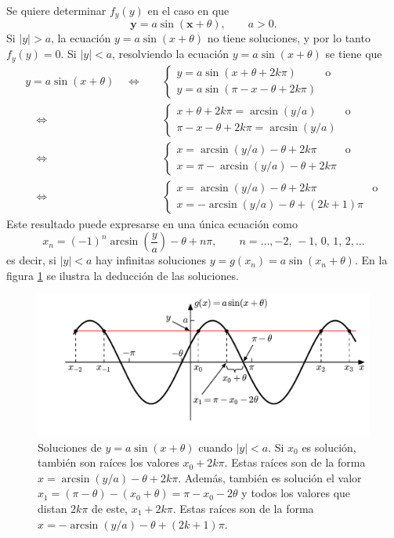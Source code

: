 \documentclass[a4paper]{report}
\newcommand{\x}{\mathbf{x}}
\newcommand{\y}{\mathbf{y}}
\begin{document}
Se quiere determinar \(f_y(y)\) en el caso en que
\[
 \y=a\sin(\x+\theta), \qquad a>0.
\]
Si \(|y|>a\), la ecuación \(y=a\sin(x+\theta)\) no tiene soluciones, y por lo tanto \(f_y(y)=0\). Si \(|y|<a\), resolviendo la ecuación \(y=a\sin(x+\theta)\) se tiene que
\begin{align*}
 y=a\sin(x+\theta)\quad\Leftrightarrow\quad &
 \left\{\begin{array}{ll}
  y=a\sin(x+\theta+2k\pi) & \textrm{o}\\
  y=a\sin(\pi-x-\theta+2k\pi) & 
 \end{array}\right.\\
 \quad\Leftrightarrow\quad &
 \left\{\begin{array}{ll}
  x+\theta+2k\pi=\arcsin(y/a) & \textrm{o}\\
  \pi-x-\theta+2k\pi=\arcsin(y/a) & 
 \end{array}\right.\\
 \quad\Leftrightarrow\quad &
 \left\{\begin{array}{ll}
  x=\arcsin(y/a)-\theta+2k\pi & \textrm{o}\\
  x=\pi-\arcsin(y/a)-\theta+2k\pi & 
 \end{array}\right.\\
 \quad\Leftrightarrow\quad &
 \left\{\begin{array}{ll}
  x=\arcsin(y/a)-\theta+2k\pi & \textrm{o}\\
  x=-\arcsin(y/a)-\theta+(2k+1)\pi & 
 \end{array}\right.
\end{align*}
Este resultado puede expresarse en una única ecuación como
\begin{equation}\label{eq:functions_of_rv_arcsin}
 x_n=(-1)^n\arcsin\left(\frac{y}{a}\right)-\theta+n\pi,\qquad n=\dots,-2,\,-1,\,0,\,1,\,2,\dots
\end{equation}
es decir, si \(|y|<a\) hay infinitas soluciones \(y=g(x_n)=a\sin(x_n+\theta)\). En la figura \ref{fig:fy_with_y_sin_x} se ilustra la deducción de las soluciones.
\begin{figure}[!htb]
\begin{center}
\includegraphics[width=0.8\columnwidth]{figuras/fy_with_y_sin_x.pdf}
\caption{\label{fig:fy_with_y_sin_x} Soluciones de \(y=a\sin(x+\theta)\) cuando \(|y|<a\). Si \(x_0\) es solución, también son raíces los valores \(x_0+2k\pi\). Estas raíces son de la forma \(x=\arcsin(y/a)-\theta+2k\pi\). Además, también es solución el valor \(x_1=(\pi-\theta)-(x_0+\theta)=\pi-x_0-2\theta\) y todos los valores que distan \(2k\pi\) de este, \(x_1+2k\pi\). Estas raíces son de la forma \(x=-\arcsin(y/a)-\theta+(2k+1)\pi\).}
\end{center}
\end{figure}
\end{document}
